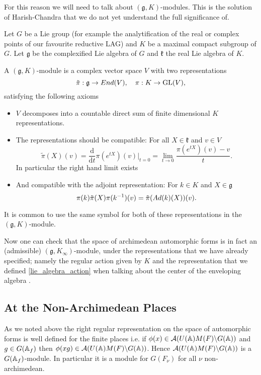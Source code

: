 For this reason we will need to talk about \((\mathfrak{g}, K)\)-modules. This is the solution of Harish-Chandra that we do not yet understand the full significance of. 

\begin{definition}
    Let \(G\) be a Lie group (for example the analytification of the real or complex points of our favourite reductive LAG) and \(K\) be a maximal compact subgroup of \(G\). Let \(\mathfrak{g}\) be the complexified Lie algebra of \(G\) and \(\mathfrak{k}\) the real Lie algebra of \(K\). 
    
    A \((\mathfrak{g}, K)\)-module is a complex vector space \(V\) with two representations 
    \[\tilde{\pi}: \mathfrak{g} \to End(V), \quad \pi: K\to \operatorname{GL}(V),\]
    satisfying the following axioms
    \begin{itemize}
        \item \(V\) decomposes into a countable direct sum of finite dimensional \(K\) representations.
        \item The representations should be compatible: For all \(X \in \mathfrak{k}\) and \(v\in V\)
        \[\tilde{\pi}(X)(v) = \frac{\mathrm{d}}{\mathrm{d}t}\pi(e^{tX})(v)|_{t=0} = \lim_{t\to 0}\frac{\pi(e^{tX})(v) - v}{t}.\]
        In particular the right hand limit exists
        \item And compatible with the adjoint representation: For \(k\in K\) and \(X\in \mathfrak{g}\) 
         \[\pi(k)\tilde{\pi}(X) \pi(k^{-1} )(v) = \tilde{\pi}(Ad(k)(X))(v).\]
    \end{itemize}
\end{definition}

\begin{remark}
    It is common to use the same symbol for both of these representations in the \((\mathfrak{g}, K)\)-module.
\end{remark}
Now one can check that the space of archimedean automorphic forms is in fact an (admissible) \((\mathfrak{g}, K_\infty)\)-module, under the representations that we have already specified; namely the regular action given by \(K\) and the representation that we defined \ref{lie_algebra_action} when talking about the center of the enveloping algebra \cite[Thm. 6.2.6]{getzIntroductionAutomorphicRepresentations2024}.

\subsection{At the Non-Archimedean Places}
As we noted above the right regular representation on the space of automorphic forms is well defined for the finite places i.e. 
if \(\phi(x)\in \mathcal{A}(U(\A)M(F)\backslash G(\A))\) and \(g\in G(\A_f)\) then \(\phi(xg) \in \mathcal{A}(U(\A)M(F)\backslash G(\A)) \). Hence \(\mathcal{A}(U(\A)M(F)\backslash G(\A))\) is a \(G(\A_f)\)-module. In particular it is a module for \(G(F_\nu)\) for all \(\nu\) non-archimedean.

